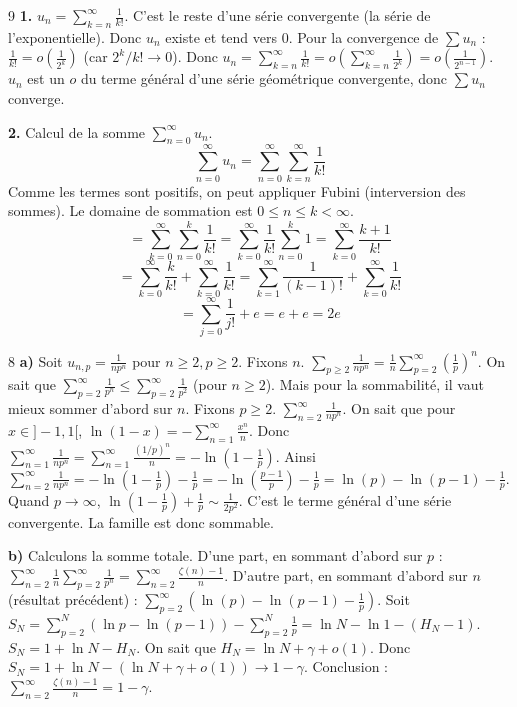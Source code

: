 \begin{correction}{9}
\textbf{1.} $u_n = \sum_{k=n}^\infty \frac{1}{k!}$. C'est le reste d'une série convergente (la série de l'exponentielle). Donc $u_n$ existe et tend vers 0.
Pour la convergence de $\sum u_n$ :
$\frac{1}{k!} = o(\frac{1}{2^k})$ (car $2^k/k! \to 0$).
Donc $u_n = \sum_{k=n}^\infty \frac{1}{k!} = o(\sum_{k=n}^\infty \frac{1}{2^k}) = o(\frac{1}{2^{n-1}})$.
$u_n$ est un $o$ du terme général d'une série géométrique convergente, donc $\sum u_n$ converge.

\textbf{2.} Calcul de la somme $\sum_{n=0}^\infty u_n$.
$$ \sum_{n=0}^\infty u_n = \sum_{n=0}^\infty \sum_{k=n}^\infty \frac{1}{k!} $$
Comme les termes sont positifs, on peut appliquer Fubini (interversion des sommes).
Le domaine de sommation est $0 \le n \le k < \infty$.
$$ = \sum_{k=0}^\infty \sum_{n=0}^k \frac{1}{k!} = \sum_{k=0}^\infty \frac{1}{k!} \sum_{n=0}^k 1 = \sum_{k=0}^\infty \frac{k+1}{k!} $$
$$ = \sum_{k=0}^\infty \frac{k}{k!} + \sum_{k=0}^\infty \frac{1}{k!} = \sum_{k=1}^\infty \frac{1}{(k-1)!} + \sum_{k=0}^\infty \frac{1}{k!} $$
$$ = \sum_{j=0}^\infty \frac{1}{j!} + e = e + e = 2e $$
\end{correction}

\begin{correction}{8}
\textbf{a)} Soit $u_{n,p} = \frac{1}{n p^n}$ pour $n \ge 2, p \ge 2$.
Fixons $n$. $\sum_{p \ge 2} \frac{1}{n p^n} = \frac{1}{n} \sum_{p=2}^\infty (\frac{1}{p})^n$.
On sait que $\sum_{p=2}^\infty \frac{1}{p^n} \le \sum_{p=2}^\infty \frac{1}{p^2}$ (pour $n \ge 2$).
Mais pour la sommabilité, il vaut mieux sommer d'abord sur $n$.
Fixons $p \ge 2$. $\sum_{n=2}^\infty \frac{1}{n p^n}$.
On sait que pour $x \in ]-1,1[$, $\ln(1-x) = -\sum_{n=1}^\infty \frac{x^n}{n}$.
Donc $\sum_{n=1}^\infty \frac{1}{n p^n} = \sum_{n=1}^\infty \frac{(1/p)^n}{n} = -\ln(1-\frac{1}{p})$.
Ainsi $\sum_{n=2}^\infty \frac{1}{n p^n} = -\ln(1-\frac{1}{p}) - \frac{1}{p} = -\ln(\frac{p-1}{p}) - \frac{1}{p} = \ln(p) - \ln(p-1) - \frac{1}{p}$.
Quand $p \to \infty$, $\ln(1-\frac{1}{p}) + \frac{1}{p} \sim \frac{1}{2p^2}$.
C'est le terme général d'une série convergente.
La famille est donc sommable.

\textbf{b)} Calculons la somme totale.
D'une part, en sommant d'abord sur $p$ :
$\sum_{n=2}^\infty \frac{1}{n} \sum_{p=2}^\infty \frac{1}{p^n} = \sum_{n=2}^\infty \frac{\zeta(n)-1}{n}$.
D'autre part, en sommant d'abord sur $n$ (résultat précédent) :
$\sum_{p=2}^\infty (\ln(p) - \ln(p-1) - \frac{1}{p})$.
Soit $S_N = \sum_{p=2}^N (\ln p - \ln(p-1)) - \sum_{p=2}^N \frac{1}{p} = \ln N - \ln 1 - (H_N - 1)$.
$S_N = 1 + \ln N - H_N$.
On sait que $H_N = \ln N + \gamma + o(1)$.
Donc $S_N = 1 + \ln N - (\ln N + \gamma + o(1)) \to 1 - \gamma$.
Conclusion : $\sum_{n=2}^\infty \frac{\zeta(n)-1}{n} = 1-\gamma$.
\end{correction}


